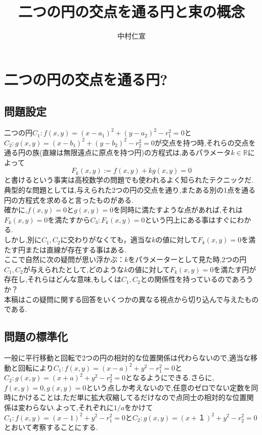 \documentclass[a4j,12pt]{jarticle}
\numberwithin{equation}{section}
\newcommand{\R}{\mathbb R}
\begin{document}
\title{二つの円の交点を通る円と束の概念}
\date{}
\author{中村仁宣}
\maketitle

\section{二つの円の交点を通る円?}

\subsection{問題設定}
二つの円$C_1 : f(x,y) = (x-a_1)^2 + (y-a_2)^2 - r_1^2 =0$と$C_2:g(x,y) = (x-b_1)^2 + (y-b_2)^2 - r_2^2 =0$が交点を持つ時,それらの交点を通る円の族(直線は無限遠点に原点を持つ円)の方程式は,あるパラメータ$k \in \R$によって
\begin{equation}
F_k(x,y) := f(x,y) + k g(x,y) = 0
\end{equation}
と書けるという事実は高校数学の問題でも使われるよく知られたテクニックだ.典型的な問題としては,与えられた2つの円の交点を通り,またある別の1点を通る円の方程式を求めると言ったものがある.\\
確かに,$f(x,y)=0$と$g(x,y)=0$を同時に満たすような点があれば,それは$F_k(x,y)=0$を満たすから$C_3:F_k(x,y)=0$という円上にある事はすぐにわかる.\\
しかし,別に$C_1, C_2$に交わりがなくても，適当な$k$の値に対して$F_k(x,y)=0$を満たす円または直線が存在する事はある. \\
ここで自然に次の疑問が思い浮かぶ：$k$をパラメーターとして見た時,2つの円$C_1,C_2$が与えられたとして,どのような$k$の値に対して$F_k(x,y)=0$を満たす円が存在し,それらはどんな意味,もしくは$C_1,C_2$との関係性を持っているのであろうか？\\
本稿はこの疑問に関する回答をいくつかの異なる視点から切り込んで与えたものである.

\subsection{問題の標準化}

一般に平行移動と回転で2つの円の相対的な位置関係は代わらないので,適当な移動と回転により$C_1 : f(x,y) = (x-a)^2 + y^2 - r_1^2 =0$と$C_2:g(x,y) = (x+a)^2 + y^2 - r_2^2 =0$となるようにできる.さらに,$f(x,y)=0,g(x,y)=0$という点しか考えないので,任意のゼロでない定数を同時にかけることは,ただ単に拡大収縮してるだけなので点同士の相対的な位置関係は変わらない.よって,それぞれに$1/a$をかけて$C_1 : f(x,y) = (x-1)^2 + y^2 - r_1^2 =0$と$C_2:g(x,y) = (x+１)^2 + y^2 - r_2^2 =0$とおいて考察することにする.
\end{document}
